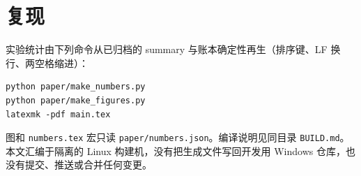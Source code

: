 \documentclass[11pt,a4paper]{article}
\begin{document}
\section*{复现}

实验统计由下列命令从已归档的 summary 与账本确定性再生（排序键、LF 换行、两空格缩进）：
\begin{verbatim}
python paper/make_numbers.py
python paper/make_figures.py
latexmk -pdf main.tex
\end{verbatim}
图和 \texttt{numbers.tex} 宏只读 \texttt{paper/numbers.json}。编译说明见同目录 \texttt{BUILD.md}。本文汇编于隔离的 Linux 构建机，没有把生成文件写回开发用 Windows 仓库，也没有提交、推送或合并任何变更。



\end{document}

